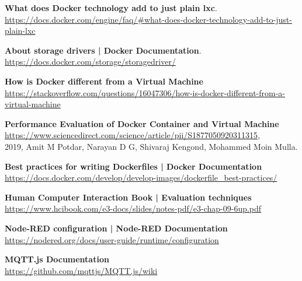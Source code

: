 \documentclass[a4paper,10pt]{memoir}
\begin{document}
\begin{thebibliography}{9}
  \textbf{What does Docker technology add to just plain lxc}.\\
  \href{https://docs.docker.com/engine/faq/#what-does-docker-technology-add-to-just-plain-lxc}{https://docs.docker.com/engine/faq/\#what-does-docker-technology-add-to-just-plain-lxc}

  \textbf{About storage drivers | Docker Documentation}.\\
  \href{https://docs.docker.com/storage/storagedriver/}{https://docs.docker.com/storage/storagedriver/}

    \textbf{How is Docker different from a Virtual Machine}
    \\
    \href{https://stackoverflow.com/questions/16047306/how-is-docker-different-from-a-virtual-machine}{https://stackoverflow.com/questions/16047306/how-is-docker-different-from-a-virtual-machine}

    \textbf{Performance Evaluation of Docker Container and Virtual Machine}
    \\
    \href{https://www.sciencedirect.com/science/article/pii/S1877050920311315}{https://www.sciencedirect.com/science/article/pii/S1877050920311315},
    \\
    2019, Amit M Potdar, Narayan D G, Shivaraj Kengond, Mohammed Moin Mulla.

    \textbf{Best practices for writing Dockerfiles | Docker Documentation}
    \\
    \href{https://docs.docker.com/develop/develop-images/dockerfile_best-practices/}{https://docs.docker.com/develop/develop-images/dockerfile\_best-practices/}

    \textbf{Human Computer Interaction Book | Evaluation techniques}
    \\
    \href{https://www.hcibook.com/e3-docs/slides/notes-pdf/e3-chap-09-6up.pdf}{https://www.hcibook.com/e3-docs/slides/notes-pdf/e3-chap-09-6up.pdf}
    
    \textbf{Node-RED configuration | Node-RED Documentation }
    \\
    \href{https://nodered.org/docs/user-guide/runtime/configuration}{https://nodered.org/docs/user-guide/runtime/configuration}

    \textbf{MQTT.js Documentation}
    \\
    \href{https://github.com/mqttjs/MQTT.js/wiki}{https://github.com/mqttjs/MQTT.js/wiki}


\end{thebibliography}
\end{document}
